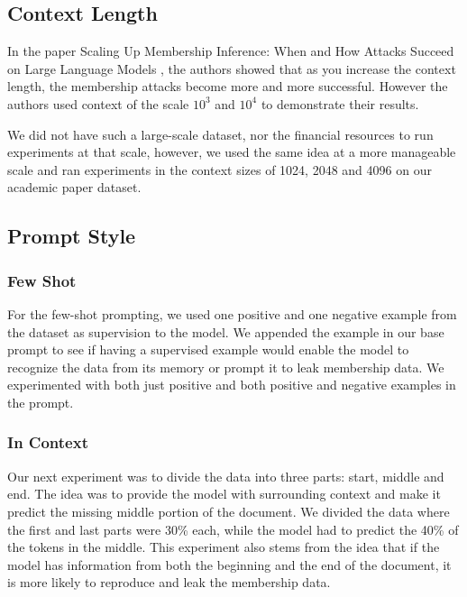 \documentclass[sigconf]{acmart}
\begin{document}


\subsection{Context Length}
 In the paper Scaling Up Membership Inference: When and How Attacks Succeed on Large Language Models \cite{arxivScalingMembership}, the authors showed that as you increase the context length, the membership attacks become more and more successful. However the authors used context of the scale $10^3$ and $10^4$ to demonstrate their results. 

 We did not have such a large-scale dataset, nor the financial resources to run experiments at that scale, however, we used the same idea at a more manageable scale and ran experiments in the context sizes of  1024, 2048 and 4096 on our academic paper dataset.

\subsection{Prompt Style}

\subsubsection{Few Shot}

For the few-shot prompting, we used one positive and one negative example from the dataset as supervision to the model. We appended the example in our base prompt to see if having a supervised example would enable the model to recognize the data from its memory or prompt it to leak membership data. We experimented with both just positive and both positive and negative examples in the prompt. 

\subsubsection{In Context}

Our next experiment was to divide the data into three parts: start, middle and end. The idea was to provide the model with surrounding context and make it predict the missing middle portion of the document. We divided the data where the first and last parts were 30\% each, while the model had to predict the 40\% of the tokens in the middle. This experiment also stems from the idea that if the model has information from both the beginning and the end of the document, it is more likely to reproduce and leak the membership data. 
\end{document}
